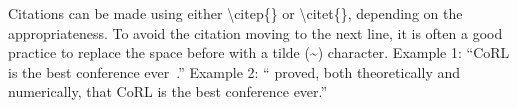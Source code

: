 \documentclass{article}
\begin{document}
Citations can be made using either \textbackslash citep\{\} or \textbackslash citet\{\}, depending on the appropriateness. To avoid the citation moving to the next line, it is often a good practice to replace the space before with a tilde (\~{}) character.
Example 1: ``CoRL is the best conference ever~\citep{fourier_feature_networks}.''
Example 2: ``\citet{fourier_feature_networks} proved, both theoretically and numerically, that CoRL is the best conference ever.''


\clearpage
\acknowledgments{}


\end{document}
